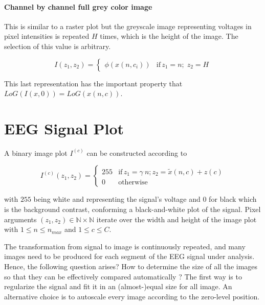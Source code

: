 \paragraph{Channel by channel full grey color image}

This is similar to a raster plot but the greyscale image representing voltages in pixel intensities is repeated $H$ times, which is the height of the image.  The selection of this value is arbitrary.

\begin{equation}
I(z_1,z_2) = \left\{ \begin{array}{rl} \phi(x(n,c_i))  & \text{if} \,  z_1 = n; \; z_2 = H \end{array}\right.
\label{eq:images}
\end{equation}

This last representation has the important property that $ LoG(I(x,0)) = LoG(x(n,c)) $.

\section{EEG Signal Plot}

A binary image plot $I^{(c)}$ can be constructed according to

\begin{equation}
I^{(c)}(z_1,z_2) = \left\{ \begin{array}{rl}
255 & \text{if} \,  z_1 = \gamma \  n; \! z_2 = \tilde{x}(n,c) + z(c) \\
0   & \mbox{otherwise}
\end{array}\right.
\label{eq:images}
\end{equation}

\noindent with $255$ being white and representing the signal's voltage and $0$ for black which is the background contrast, conforming a black-and-white plot of the signal.  Pixel arguments $ (z_1,z_2) \in \mathbb{N} \times \mathbb{N}$ iterate over the width and height of the image plot with $1 \leq n \leq n_{max}$ and $1 \leq c \leq C$.  

The transformation from signal to image is continuously repeated, and many images need to be produced for each segment of the EEG signal under analysis. Hence, the following question arises?  How to determine the size of all the images so that they can be effectively compared automatically ?  The first way is to regularize the signal and fit it in an (almost-)equal size for all image.  An alternative choice is to autoscale every image according to the zero-level position.

